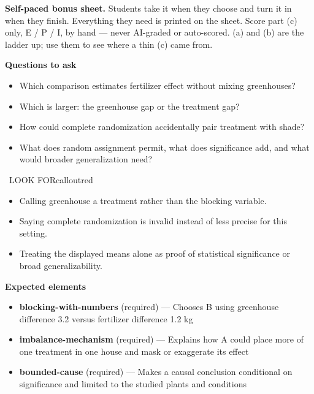 \documentclass[11pt]{article}
\begin{document}
\textbf{Self-paced bonus sheet.} Students take it when they choose and turn it in when they finish. Everything they need is printed on the sheet. Score part (c) only, E / P / I, by hand --- never AI-graded or auto-scored. (a) and (b) are the ladder up; use them to see where a thin (c) came from.\par

\textbf{Questions to ask}
\begin{itemize}[leftmargin=1.5em,itemsep=2pt,topsep=2pt]
  \item Which comparison estimates fertilizer effect without mixing greenhouses?
  \item Which is larger: the greenhouse gap or the treatment gap?
  \item How could complete randomization accidentally pair treatment with shade?
  \item What does random assignment permit, what does significance add, and what would broader generalization need?
\end{itemize}

\begin{callout}{\IconWarn\ LOOK FOR}{calloutred}
\begin{itemize}[leftmargin=1.5em,itemsep=2pt,topsep=2pt]
  \item Calling greenhouse a treatment rather than the blocking variable.
  \item Saying complete randomization is invalid instead of less precise for this setting.
  \item Treating the displayed means alone as proof of statistical significance or broad generalizability.
\end{itemize}
\end{callout}


\textbf{Expected elements}
\begin{itemize}[leftmargin=1.5em,itemsep=2pt,topsep=2pt]
  \item \textbf{blocking-with-numbers} (required) --- Chooses B using greenhouse difference 3.2 versus fertilizer difference 1.2 kg
  \item \textbf{imbalance-mechanism} (required) --- Explains how A could place more of one treatment in one house and mask or exaggerate its effect
  \item \textbf{bounded-cause} (required) --- Makes a causal conclusion conditional on significance and limited to the studied plants and conditions
\end{itemize}
\end{document}
